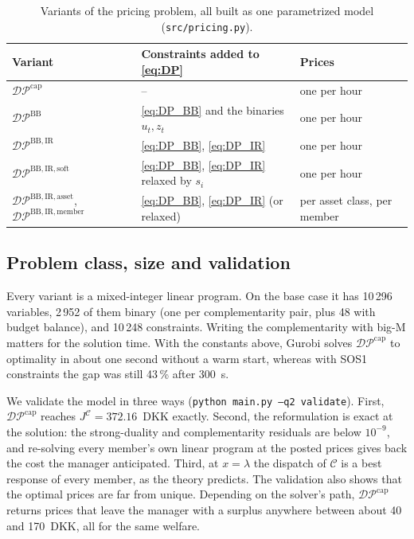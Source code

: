 \begin{table}[htbp]
\centering
\caption{Variants of the pricing problem, all built as one parametrized model (\texttt{src/pricing.py}).}
\label{tab:DP_variants}
\small
\begin{tabular}{@{}lll@{}}
\toprule
Variant & Constraints added to \eqref{eq:DP} & Prices\\
\midrule
$\mathcal{DP}^{\mathrm{cap}}$ & -- & one per hour\\
$\mathcal{DP}^{\mathrm{BB}}$ & \eqref{eq:DP_BB} and the binaries $u_t,z_t$ & one per hour\\
$\mathcal{DP}^{\mathrm{BB,IR}}$ & \eqref{eq:DP_BB}, \eqref{eq:DP_IR} & one per hour\\
$\mathcal{DP}^{\mathrm{BB,IR,soft}}$ & \eqref{eq:DP_BB}, \eqref{eq:DP_IR} relaxed by $s_i$ & one per hour\\
$\mathcal{DP}^{\mathrm{BB,IR,asset}}$, $\mathcal{DP}^{\mathrm{BB,IR,member}}$ & \eqref{eq:DP_BB}, \eqref{eq:DP_IR} (or relaxed) & per asset class, per member\\
\bottomrule
\end{tabular}
\end{table}

\subsection{Problem class, size and validation}
Every variant is a mixed-integer linear program.
On the base case it has 10\,296 variables, 2\,952 of them binary (one per complementarity pair, plus 48 with budget balance), and 10\,248 constraints.
Writing the complementarity with big-M matters for the solution time.
With the constants above, Gurobi solves $\mathcal{DP}^{\mathrm{cap}}$ to optimality in about one second without a warm start, whereas with SOS1 constraints the gap was still 43\,\% after 300~s.

We validate the model in three ways (\texttt{python main.py --q2 validate}).
First, $\mathcal{DP}^{\mathrm{cap}}$ reaches $J^{\mathcal{C}}=372.16$~DKK exactly.
Second, the reformulation is exact at the solution: the strong-duality and complementarity residuals are below $10^{-9}$, and re-solving every member's own linear program at the posted prices gives back the cost the manager anticipated.
Third, at $x=\lambda$ the dispatch of $\mathcal{C}$ is a best response of every member, as the theory predicts.
The validation also shows that the optimal prices are far from unique.
Depending on the solver's path, $\mathcal{DP}^{\mathrm{cap}}$ returns prices that leave the manager with a surplus anywhere between about 40 and 170~DKK, all for the same welfare.

